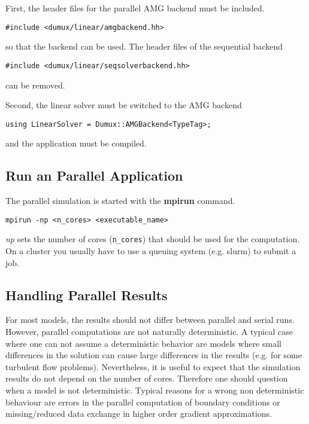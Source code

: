First, the header files for the parallel AMG backend must be included.

\begin{lstlisting}[style=DumuxCode]
#include <dumux/linear/amgbackend.hh>
\end{lstlisting}

so that the backend can be used. The header files of the sequential backend

\begin{lstlisting}[style=DumuxCode]
#include <dumux/linear/seqsolverbackend.hh>
\end{lstlisting}
can be removed.

Second, the linear solver must be switched to the AMG backend 

\begin{lstlisting}[style=DumuxCode]
using LinearSolver = Dumux::AMGBackend<TypeTag>;
\end{lstlisting}

and the application must be compiled. 

\subsection{Run an Parallel Application}
The parallel simulation is started with the \textbf{mpirun} command.

\begin{lstlisting}[style=Bash]
mpirun -np <n_cores> <executable_name>
\end{lstlisting}

\textit{np} sets the number of cores (\texttt{n\_cores}) that should be used for the 
computation. On a cluster you usually have to use a queuing system (e.g. slurm) to 
submit a job. 

\subsection{Handling Parallel Results}
For most models, the results should not differ between parallel and serial 
runs. However, parallel computations are not naturally deterministic. 
A typical case where one can not assume a deterministic behavior are models where
small differences in the solution can cause large differences in the results 
(e.g. for some turbulent flow problems). Nevertheless, it is useful to expect that
the simulation results do not depend on the number of cores. Therefore one should question
when a model is not deterministic. Typical reasons for a wrong non deterministic
behaviour are errors in the parallel computation of boundary conditions or missing/reduced
data exchange in higher order gradient approximations. 


